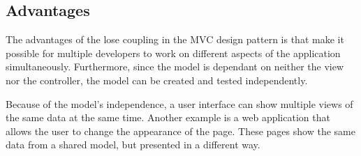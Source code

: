 \subsection{Advantages}


The advantages of the lose coupling in the MVC design pattern is that make it possible for multiple developers to work on different aspects of the application simultaneously. Furthermore, since the model is dependant on neither the view nor the controller, the model can be created and tested independently\cite{modelviewcontroller}.


Because of the model's independence, a user interface can show multiple views of the same data at the same time\cite{modelviewcontroller}. Another example is a web application that allows the user to change the appearance of the page. These pages show the same data from a shared model, but presented in a different way\cite{modelviewcontroller}. 